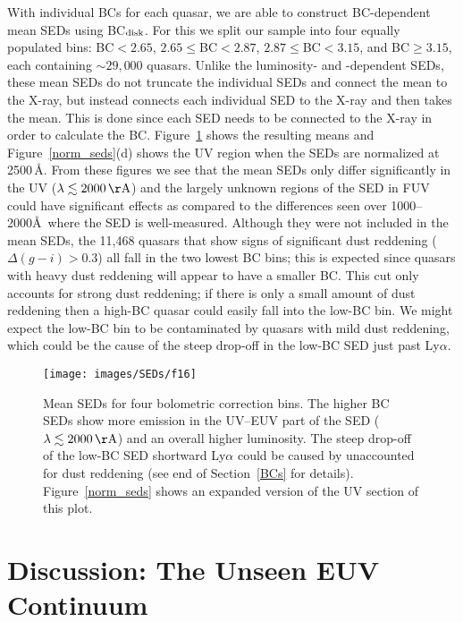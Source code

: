With individual BCs for each quasar, we are able to construct BC-dependent mean SEDs using BC$_{\rm disk}$.  For this we split our sample into four equally populated bins: BC$<2.65$, $2.65\leq$BC$<2.87$, $2.87\leq$BC$<3.15$, and BC$\geq 3.15$, each containing $\sim29,000$ quasars. Unlike the luminosity- and \civ-dependent SEDs, these mean SEDs do not truncate the individual SEDs and connect the mean to the X-ray, but instead connects each individual SED to the X-ray and then takes the mean.  This is done since each SED needs to be connected to the X-ray in order to calculate the BC.  Figure~\ref{bc_bin} shows the resulting means and Figure~\ref{norm_seds}(d) shows the UV region when the SEDs are normalized at 2500\,\AA.  From these figures we see that the mean SEDs only differ significantly in the UV ($\lambda \lesssim 2000\,{\rm \AA}$) and the largely unknown regions of the SED in FUV could have significant effects as compared to the differences seen over 1000--2000\AA\ where the SED is well-measured.  
Although they were not included in the mean SEDs, the 11,468 quasars that show signs of significant dust reddening ($\Delta(g-i)>0.3$) all fall in the two lowest BC bins; this is expected since quasars with heavy dust reddening will appear to have a smaller BC.
This cut only accounts for strong dust reddening; if there is only a small amount of dust reddening then a high-BC quasar could easily fall into the low-BC bin. We might expect the low-BC bin to be contaminated by quasars with mild dust reddening, which could be the cause of the steep drop-off in the low-BC SED just past Ly$\alpha$.

\begin{figure}[t]
\centering
 \texttt{[image: images/SEDs/f16]}
 \caption[Bolometric correction dependent SEDs]{Mean SEDs for four bolometric correction bins. The higher BC SEDs show more emission in the UV--EUV part of the SED ($\lambda \lesssim 2000\,{\rm \AA}$) and an overall higher luminosity.  The steep drop-off of the low-BC SED shortward Ly$\alpha$ could be caused by unaccounted for dust reddening (see end of Section~\ref{BCs} for details). Figure~\ref{norm_seds} shows an expanded version of the UV section of this plot.}
 \label{bc_bin}
\end{figure}

\section{Discussion: The Unseen EUV Continuum} \label{EUV}

